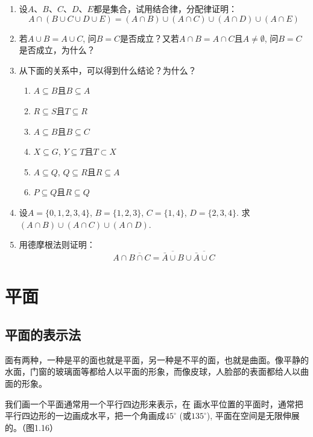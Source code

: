 \begin{enumerate}
\item   设$A$、$B$、$C$、$D$、$E$都是集合，试用结合律，分配律证明：
\[A\cap  (B\cup C\cup D\cup E)=(A\cap B)\cup (A\cap C)\cup (A\cap D)\cup (A\cap E)\] 
\item 若$A\cup B=A\cup C$, 问$B=C$是否成立？又若$A\cap B=A\cap C$且$A\ne \emptyset$, 问$B=C$是否成立，为什么？
\item 从下面的关系中，可以得到什么结论？为什么？
\begin{multicols}{2}
\begin{enumerate}
  \item $A\subseteq B$且$B\subseteq A$
  \item $R\subseteq S$且$T\subseteq R$
  \item $A\subseteq B$且$B\subseteq C$
  \item $X\subseteq G$, $Y\subseteq T$且$T\subset X$
  \item $A\subseteq Q$, $Q\subseteq R$且$R\subseteq A$
  \item $P\subseteq Q$且$R\subseteq Q$
\end{enumerate}
\end{multicols}

\item 设$A=\{0, 1, 2, 3, 4\}$, $B=\{1, 2, 3\}$, $C=\{1, 4\}$, 
  $D= \{2, 3, 4\}$. 求$(A\cap B)\cup (A\cap C)\cup (A\cap D)$.
\item 用德摩根法则证明：
\[A\cap \overline{B\cap C}=\overline{\bar A\cup B}\cup\overline{\bar A\cup C}\]
\end{enumerate}


\section{平面}

\subsection{平面的表示法}

面有两种，一种是平的面也就是平面，另一种是不平的面，也就是曲面。像平静的水面，门窗的玻璃面等都给人以平面的形象，而像皮球，人脸部的表面都给人以曲面的形象。

我们画一个平面通常用一个平行四边形来表示，在
画水平位置的平面时，通常把平行四边形的一边画成水平，把一个角画成$45^{\circ}$ (或$135^{\circ}$), 平面在空间是无限伸展的。（图1.16）

